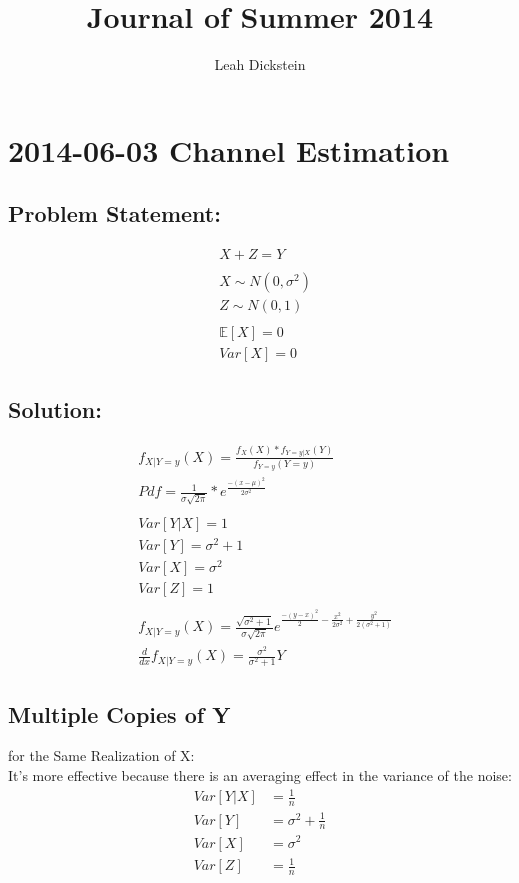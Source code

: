 \documentclass[leqno,twocolumn]{article}
\begin{document}
\onecolumn
\title{Journal of Summer 2014}
\author{Leah Dickstein}

\maketitle

\tableofcontents

\twocolumn
\section{2014-06-03 Channel Estimation}
\subsection{Problem Statement:}
\begin{align*}
&X + Z = Y\\
\\
&X \sim N(0,\sigma^2)\\
&Z \sim N(0, 1)\\
\\
&\mathbb{E}[X] = 0\\
&Var[X] = 0
\end{align*}

\subsection{Solution:}
\begin{align*}
&f_{X|Y=y}(X) = \frac{f_X(X)*f_{Y=y|X}(Y)}{f_{Y=y}(Y=y)}\\
&Pdf = \frac{1}{\sigma \sqrt{2\pi}}*e^{\frac{-(x-\mu)^2}{2\sigma^2}}\\
\\
&Var[Y|X] = 1\\
&Var[Y] = \sigma^2 + 1\\
&Var[X] = \sigma^2\\
&Var[Z] = 1\\
\\
&f_{X|Y=y}(X) = \frac{\sqrt{\sigma^2+1}}{\sigma\sqrt{2\pi}}e^{\frac{-(y-x)^2}{2}-\frac{x^2}{2\sigma^2}+\frac{y^2}{2(\sigma^2+1)}}\\
&\frac{d}{dx} f_{X|Y=y}(X) = \frac{\sigma^2}{\sigma^2+1}Y
\end{align*}

\subsection{Multiple Copies of Y}
for the Same Realization of X:\\
It's more effective because there is an averaging effect in the variance of the noise:
\begin{align*}
Var[Y|X] &= \frac{1}{n}\\
Var[Y] &= \sigma^2 + \frac{1}{n}\\
Var[X] &= \sigma^2\\
Var[Z] &= \frac{1}{n}
\end{align*}
\end{document}
